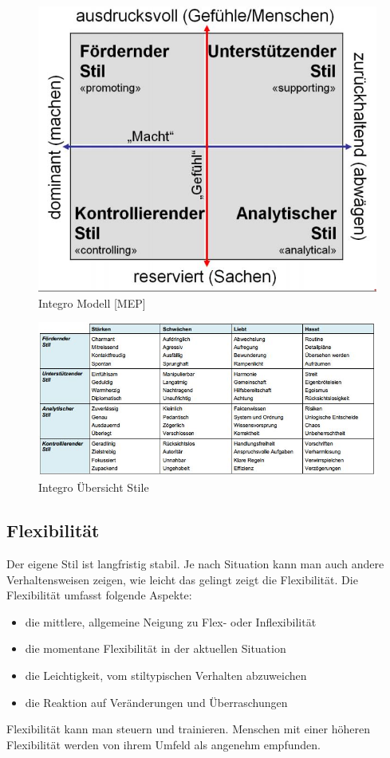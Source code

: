 \begin{figure}[h!]
\centering
\includegraphics[width=0.5\linewidth]{fig/integro-modell}
\caption{Integro Modell [MEP]}
\label{fig:integro-modell}
\end{figure}

\begin{figure}[h!]
\centering
\includegraphics[width=0.7\linewidth]{fig/integro-uebersicht-stile-attribute}
\caption{Integro Übersicht Stile}
\label{fig:integro-uebersicht-stile-attribute}
\end{figure}

\subsection{Flexibilität}
Der eigene Stil ist langfristig stabil. Je nach Situation kann man auch andere Verhaltensweisen zeigen, wie leicht das gelingt zeigt die Flexibilität. Die Flexibilität umfasst folgende Aspekte:
\begin{itemize}
	 \item die mittlere, allgemeine Neigung zu Flex- oder Inflexibilität
	 \item die momentane Flexibilität in der aktuellen Situation
	 \item die Leichtigkeit, vom stiltypischen Verhalten abzuweichen
	 \item die Reaktion auf Veränderungen und Überraschungen
\end{itemize}
Flexibilität kann man steuern und trainieren. Menschen mit einer höheren Flexibilität werden von ihrem Umfeld als angenehm empfunden.